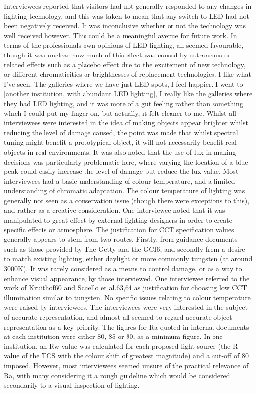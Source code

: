 Interviewees reported that visitors had not generally responded to any changes in lighting technology, and this was taken to mean that any switch to LED had not been negatively received. It was inconclusive whether or not the technology was well received however. This could be a meaningful avenue for future work. In terms of the professionals own opinions of LED lighting, all seemed favourable, though it was unclear how much of this effect was caused by extraneous or related effects such as a placebo effect due to the excitement of new technology, or different chromaticities or brightnesses of replacement technologies.  
I like what I've seen. The galleries where we have just LED spots, I feel happier. I went to [another institution, with abundant LED lighting], I really like the galleries where they had LED lighting, and it was more of a gut feeling rather than something which I could put my finger on, but actually, it felt cleaner to me.
Whilst all interviewees were interested in the idea of making objects appear brighter whilst reducing the level of damage caused, the point was made that whilst spectral tuning might benefit a prototypical object, it will not necessarily benefit real objects in real environments. It was also noted that the use of lux in making decisions was particularly problematic here, where varying the location of a blue peak could easily increase the level of damage but reduce the lux value.
Most interviewees had a basic understanding of colour temperature, and a limited understanding of chromatic adaptation. The colour temperature of lighting was generally not seen as a conservation issue (though there were exceptions to this), and rather as a creative consideration. One interviewee noted that it was manipulated to great effect by external lighting designers in order to create specific effects or atmosphere.
The justification for CCT specification values generally appears to stem from two routes. Firstly, from guidance documents such as those provided by The Getty and the GCI6, and secondly from a desire to match existing lighting, either daylight or more commonly tungsten (at around 3000K). It was rarely considered as a means to control damage, or as a way to enhance visual appearance, by those interviewed. One interviewee referred to the work of Kruithof60 and Scuello et al.63,64 as justification for choosing low CCT illumination similar to tungsten. No specific issues relating to colour temperature were raised by interviewees.
The interviewees were very interested in the subject of accurate representation, and almost all seemed to regard accurate object representation as a key priority. The figures for Ra quoted in internal documents at each institution were either 80, 85 or 90, as a minimum figure. In one institution, an Rw value was calculated for each proposed light source (the R value of the TCS with the colour shift of greatest magnitude) and a cut-off of 80 imposed. However, most interviewees seemed unsure of the practical relevance of Ra, with many considering it a rough guideline which would be considered secondarily to a visual inspection of lighting.
